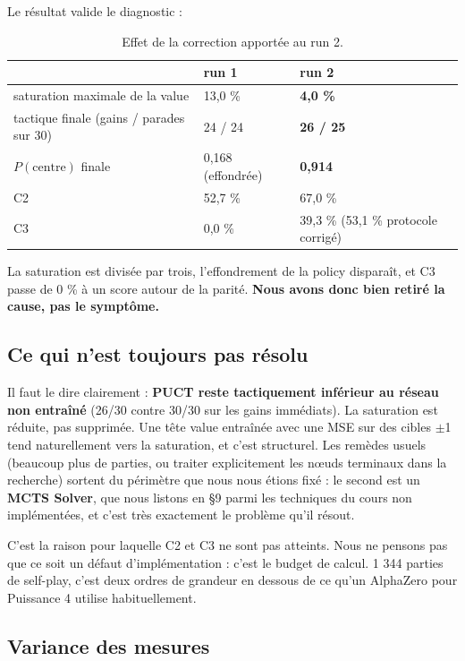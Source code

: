 \documentclass[11pt,a4paper]{article}
\begin{document}
Le résultat valide le diagnostic :

\begin{table}[htbp]
\centering\small
\caption{Effet de la correction apportée au run 2.}
\label{tab:run2}
\begin{tabular}{@{}lll@{}}
\toprule
& run 1 & run 2 \\
\midrule
saturation maximale de la value & 13,0 \% & \textbf{4,0 \%} \\
tactique finale (gains / parades sur 30) & 24 / 24 & \textbf{26 / 25} \\
$P(\text{centre})$ finale & 0,168 (effondrée) & \textbf{0,914} \\
C2 & 52,7 \% & 67,0 \% \\
C3 & 0,0 \% & 39,3 \% (53,1 \% protocole corrigé) \\
\bottomrule
\end{tabular}
\end{table}

La saturation est divisée par trois, l'effondrement de la policy disparaît, et C3
passe de 0 \% à un score autour de la parité. \textbf{Nous avons donc bien retiré la cause,
pas le symptôme.}

\subsection{Ce qui n'est toujours pas résolu}\label{ce-qui-nest-toujours-pas-ruxe9solu}

Il faut le dire clairement : \textbf{PUCT reste tactiquement inférieur au réseau non
entraîné} (26/30 contre 30/30 sur les gains immédiats). La saturation est réduite,
pas supprimée. Une tête value entraînée avec une MSE sur des cibles $\pm$1 tend
naturellement vers la saturation, et c'est structurel. Les remèdes usuels
(beaucoup plus de parties, ou traiter explicitement les nœuds terminaux dans la
recherche) sortent du périmètre que nous nous étions fixé : le second est un
\textbf{MCTS Solver}, que nous listons en §9 parmi les techniques du cours non
implémentées, et c'est très exactement le problème qu'il résout.

C'est la raison pour laquelle C2 et C3 ne sont pas atteints. Nous ne pensons pas
que ce soit un défaut d'implémentation : c'est le budget de calcul. 1 344 parties
de self-play, c'est deux ordres de grandeur en dessous de ce qu'un AlphaZero pour
Puissance 4 utilise habituellement.

\subsection{Variance des mesures}\label{variance-des-mesures}
\end{document}

